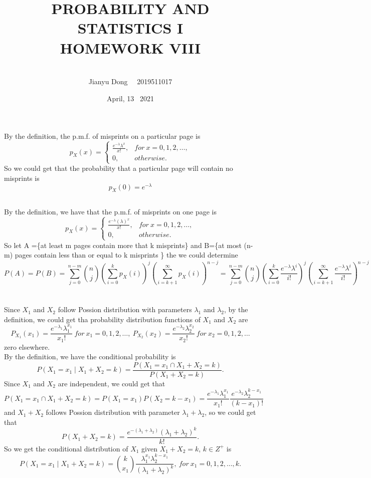 \documentclass[10.5pt]{article}
\title{PROBABILITY AND STATISTICS I
\\HOMEWORK VIII}
\author{\\Jianyu Dong   ~~2019511017}
\date{April, 13~ 2021}
\begin{document}
    
\maketitle
\newpage

\section{}
\subsection{}
By the definition, the p.m.f. of misprints on a particular page is $$p_X(x)=\begin{cases}
    \frac{e^{-\lambda}\lambda^x}{x!},&for~x=0,1,2,\dots,\\
    0,&otherwise.
\end{cases}$$\indent
So we could get that the probability that a particular page will contain no misprints is $$p_X(0)=e^{-\lambda}$$
\subsection{}
By the definition, we have that the p.m.f. of misprints on one page is $$p_X(x)=\begin{cases}
    \frac{e^{-\lambda}(\lambda)^x}{x!},&for ~x=0,1,2,\dots,\\
    0,&otherwise.
\end{cases}$$\indent
So let A =\{at least m pages contain more that k misprints\} and B=\{at most (n-m) pages contain less than or equal to k misprints \} the we could determine $$P(A)=P(B)=\sum_{j=0}^{n-m}\binom{n}{j}\left(\sum_{i=0}^kp_X(i)\right)^j\left(\sum_{i=k+1}^{\infty}p_X(i)\right)^{n-j}=\sum_{j=0}^{n-m}\binom{n}{j}\left(\sum_{i=0}^k\frac{e^{-\lambda}\lambda^i}{i!}\right)^j\left(\sum_{i=k+1}^{\infty}\frac{e^{-\lambda}\lambda^i}{i!}\right)^{n-j}$$

\section{}
Since $X_1$ and $X_2$ follow Possion distribution with parameters $\lambda_1$ and $\lambda_2$, by the definition, we could get tha probability distribution functions of $X_1$ and $X_2$ are $$P_{X_1}(x_1)=\frac{e^{-\lambda_1}\lambda_1^{x_1}}{x_1!}~for ~x_1=0,1,2,\dots,~P_{X_2}(x_2)=\frac{e^{-\lambda_2}\lambda_2^{x_2}}{x_2!}~for ~x_2=0,1,2,\dots$$\indent
zero elsewhere.\\\indent
By the definition, we have the conditional probability is $$P(X_1=x_1\mid X_1+X_2=k)=\frac{P(X_1=x_1\cap X_1+X_2=k)}{P(X_1+X_2=k)}.$$\indent
Since $X_1$ and $X_2$ are independent, we could get that $$P(X_1=x_1\cap X_1+X_2=k)=P(X_1=x_1)P(X_2=k-x_1)=\frac{e^{-\lambda_1}\lambda_1^{x_1}}{x_1!}\frac{e^{-\lambda_2}\lambda_2^{k-x_1}}{(k-x_1)!}$$\indent
and $X_1+X_2$ follows Possion distribution with parameter $\lambda_1+\lambda_2$, so we could get that $$P(X_1+X_2=k)=\frac{e^{-(\lambda_1+\lambda_2)}(\lambda_1+\lambda_2)^{k}}{k!}.$$\indent
So we get the conditional distribution of $X_1$ given $X_1+X_2=k$, $k\in Z^+$ is $$P(X_1=x_1\mid X_1+X_2=k)=\binom{k}{x_1}\frac{\lambda_1^{x_1}\lambda_2^{k-x_1}}{(\lambda_1+\lambda_2)^{k}},~for ~x_1=0,1,2,\dots,k.$$
\end{document}
